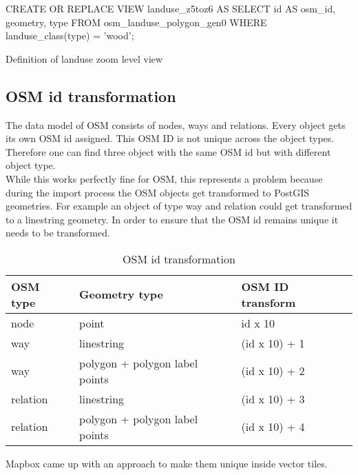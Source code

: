 \begin{listing}[H]
\begin{sqlcode}
CREATE OR REPLACE VIEW landuse_z5toz6 AS
    SELECT id AS osm_id, geometry, type
    FROM osm_landuse_polygon_gen0
    WHERE landuse_class(type) = 'wood';
\end{sqlcode}
\caption{Definition of landuse zoom level view}
\label{definition_of_landuse_zoom_level_view}
\end{listing}
\clearpage

\subsection{OSM id transformation}

The data model of OSM consists of nodes, ways and relations. Every object gets its own OSM id assigned. This OSM ID is not unique across the object types. Therefore one can find three object with the same OSM id but with different object type.\\
While this works perfectly fine for OSM, this represents a problem because during the import process the OSM objects get transformed to PostGIS geometries. For example an object of type way and relation could get transformed to a linestring geometry. In order to ensure that the OSM id remains unique it needs to be transformed.

\begin{table}[H]
\centering

\begin{tabular}{|l|l|l|}
\hline
OSM type & Geometry type                  & OSM ID transform \\ \hline
node     & point                          & id x 10          \\ \hline
way      & linestring                           & (id x 10) + 1    \\ \hline
way      & polygon + polygon label points & (id x 10) + 2    \\ \hline
relation & linestring                           & (id x 10) + 3    \\ \hline
relation & polygon + polygon label points & (id x 10) + 4    \\ \hline
\end{tabular}
\caption{OSM id transformation}
\label{osm_id_transformation}
\end{table}

Mapbox came up with an approach to make them unique inside vector tiles\cite{103_mapbox.com_2016}.

